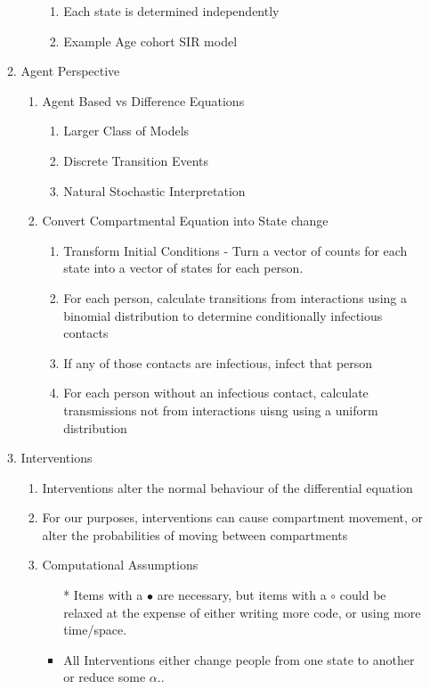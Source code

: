 \documentclass{article}
\begin{document}
\begin{enumerate}
\begin{enumerate}
\begin{enumerate}
\begin{enumerate}
				\item Each state is determined independently
				\item Example Age cohort SIR model
			\end{enumerate}
		\end{enumerate}
		\item Agent Perspective
			\begin{enumerate}
				\item Agent Based vs Difference Equations
				\begin{enumerate}
					\item Larger Class of Models
					\item Discrete Transition Events
					\item Natural Stochastic Interpretation
				\end{enumerate}
				\item Convert Compartmental Equation into State change
				\begin{enumerate}
					\item Transform Initial Conditions - Turn a vector of counts for each state into a vector of states for each person.
					\item For each person, calculate transitions from interactions using a binomial distribution to determine conditionally infectious contacts
					\item If any of those contacts are infectious, infect that person
					\item For each person without an infectious contact, calculate transmissions not from interactions uisng using a uniform distribution
				\end{enumerate}
			\end{enumerate}
		\item Interventions
		\begin{enumerate}
			\item Interventions alter the normal behaviour of the differential equation
			\item For our purposes, interventions can cause compartment movement, or alter the probabilities of moving between compartments
			\item Computational Assumptions
			\begin{itemize}
				\item[*] Items with a $\bullet$ are necessary, but items with a $\circ$ could be relaxed at the expense of either writing more code, or using more time/space.
				\item All Interventions either change people from one state to another or reduce some $\alpha$..

\end{itemize}
\end{enumerate}
\end{enumerate}
\end{enumerate}
\end{document}
